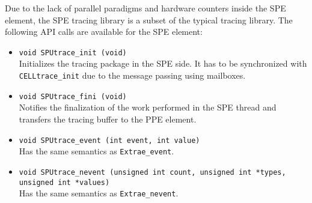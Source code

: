 Due to the lack of parallel paradigms and hardware counters inside the SPE element, the SPE tracing library is a subset of the typical tracing library. The following API calls are available for the SPE element:

\begin{itemize}

 \item {\tt void SPUtrace\_init (void)}\\
 Initializes the tracing package in the SPE side. It has to be synchronized with {\tt CELLtrace\_init} due to the message passing using mailboxes.

 \item {\tt void SPUtrace\_fini (void)}\\
 Notifies the finalization of the work performed in the SPE thread and transfers the tracing buffer to the PPE element.

 \item {\tt void SPUtrace\_event (int event, int value)}\\
 Has the same semantics as {\tt Extrae\_event}.

 \item {\tt void SPUtrace\_nevent (unsigned int count, unsigned int *types, unsigned int *values)}\\
 Has the same semantics as {\tt Extrae\_nevent}.

\end{itemize}

